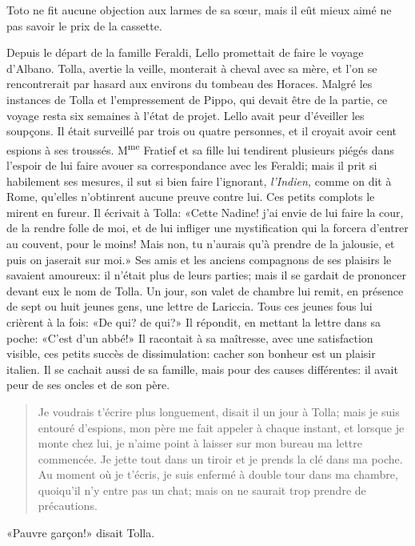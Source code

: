 Toto ne fit aucune objection aux larmes de sa sœur, mais il eût mieux
aimé ne pas savoir le prix de la cassette.

Depuis le départ de la famille Feraldi, Lello promettait de faire le
voyage d'Albano. Tolla, avertie la veille, monterait à cheval avec sa
mère, et l'on se rencontrerait par hasard aux environs du tombeau des
Horaces. Malgré les instances de Tolla et l'empressement de Pippo, qui
devait être de la partie, ce voyage resta six semaines à l'état de
projet. Lello avait peur d'éveiller les soupçons. Il était surveillé par
trois ou quatre personnes, et il croyait avoir cent espions à ses
troussés. M\textsuperscript{me} Fratief et sa fille lui tendirent
plusieurs piégés dans l'espoir de lui faire avouer sa correspondance
avec les Feraldi; mais il prit si habilement ses mesures, il sut si bien
faire l'ignorant, \emph{l'Indien,} comme on dit à Rome, qu'elles
n'obtinrent aucune preuve contre lui. Ces petits complots le mirent en
fureur. Il écrivait à Tolla: «Cette Nadine! j'ai envie de lui faire la
cour, de la rendre folle de moi, et de lui infliger une mystification
qui la forcera d'entrer au couvent, pour le moins! Mais non, tu n'aurais
qu'à prendre de la jalousie, et puis on jaserait sur moi.» Ses amis et
les anciens compagnons de ses plaisirs le savaient amoureux: il n'était
plus de leurs parties; mais il se gardait de prononcer devant eux le nom
de Tolla. Un jour, son valet de chambre lui remit, en présence de sept
ou huit jeunes gens, une lettre de Lariccia. Tous ces jeunes fous lui
crièrent à la fois: «De qui? de qui?» Il répondit, en mettant la lettre
dans sa poche: «C'est d'un abbé!» Il racontait à sa maîtresse, avec une
satisfaction visible, ces petits succès de dissimulation: cacher son
bonheur est un plaisir italien. Il se cachait aussi de sa famille, mais
pour des causes différentes: il avait peur de ses oncles et de son père.

\begin{quote}
Je voudrais t'écrire plus longuement, disait il un jour à Tolla; mais je
suis entouré d'espions, mon père me fait appeler à chaque instant, et
lorsque je monte chez lui, je n'aime point à laisser sur mon bureau ma
lettre commencée. Je jette tout dans un tiroir et je prends la clé dans
ma poche. Au moment où je t'écris, je suis enfermé à double tour dans ma
chambre, quoiqu'il n'y entre pas un chat; mais on ne saurait trop
prendre de précautions.
\end{quote}

«Pauvre garçon!» disait Tolla.

